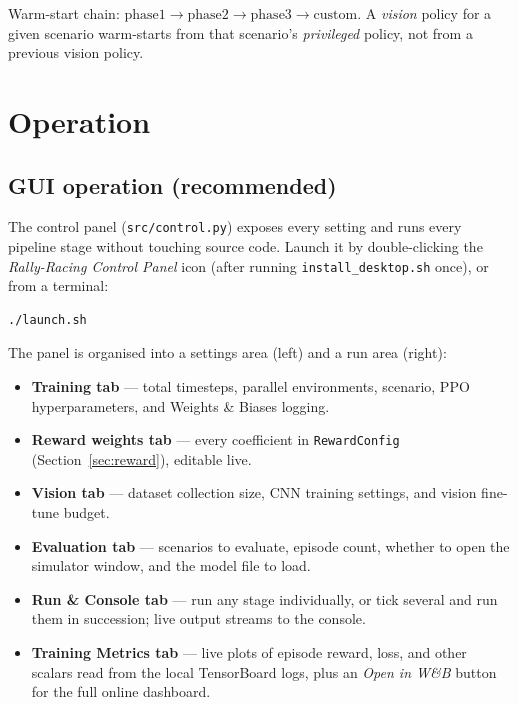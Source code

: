 \documentclass[11pt]{article}
\begin{document}
Warm-start chain: $\text{phase1} \rightarrow \text{phase2} \rightarrow
\text{phase3} \rightarrow \text{custom}$. A \emph{vision} policy for a given
scenario warm-starts from that scenario's \emph{privileged} policy, not from a
previous vision policy.

\section{Operation}\label{sec:operation}

\subsection{GUI operation (recommended)}

The control panel (\texttt{src/control.py}) exposes every setting and runs
every pipeline stage without touching source code. Launch it by
double-clicking the \emph{Rally-Racing Control Panel} icon (after running
\texttt{install\_desktop.sh} once), or from a terminal:

\begin{verbatim}
./launch.sh
\end{verbatim}

The panel is organised into a settings area (left) and a run area (right):

\begin{itemize}
  \item \textbf{Training tab} --- total timesteps, parallel environments,
        scenario, PPO hyperparameters, and Weights \& Biases logging.
  \item \textbf{Reward weights tab} --- every coefficient in
        \texttt{RewardConfig} (Section~\ref{sec:reward}), editable live.
  \item \textbf{Vision tab} --- dataset collection size, CNN training
        settings, and vision fine-tune budget.
  \item \textbf{Evaluation tab} --- scenarios to evaluate, episode count,
        whether to open the simulator window, and the model file to load.
  \item \textbf{Run \& Console tab} --- run any stage individually, or tick
        several and run them in succession; live output streams to the
        console.
  \item \textbf{Training Metrics tab} --- live plots of episode reward, loss,
        and other scalars read from the local TensorBoard logs, plus an
        \emph{Open in W\&B} button for the full online dashboard.
\end{itemize}
\end{document}
